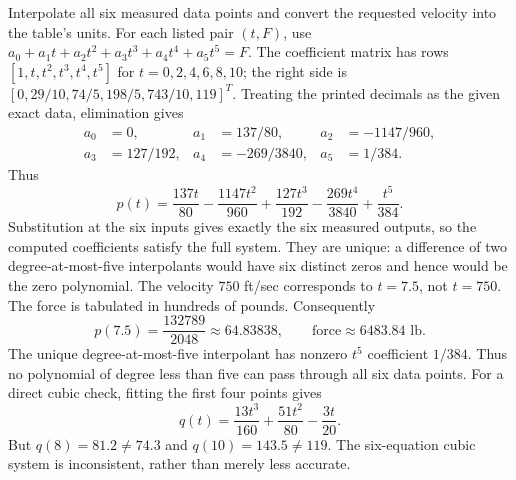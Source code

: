 \goal Interpolate all six measured data points and convert the requested
velocity into the table's units.
For each listed pair $(t,F)$, use
$a_0+a_1t+a_2t^2+a_3t^3+a_4t^4+a_5t^5=F$.
The coefficient matrix has rows $[1,t,t^2,t^3,t^4,t^5]$ for
$t=0,2,4,6,8,10$; the right side is
$[0,29/10,74/5,198/5,743/10,119]^T$.
Treating the printed decimals as the given exact data, elimination gives
\[
\begin{aligned}
a_0&=0,&a_1&=137/80,&a_2&=-1147/960,\\
a_3&=127/192,&a_4&=-269/3840,&a_5&=1/384.
\end{aligned}
\]
Thus
\[
p(t)=\frac{137t}{80}-\frac{1147t^2}{960}
 +\frac{127t^3}{192}-\frac{269t^4}{3840}+\frac{t^5}{384}.
\]
Substitution at the six inputs gives exactly the six measured outputs,
so the computed coefficients satisfy the full system. They are unique:
a difference of two degree-at-most-five interpolants would have six
distinct zeros and hence would be the zero polynomial.
The velocity $750$ ft/sec corresponds to $t=7.5$, not $t=750$.
The force is tabulated in hundreds of pounds. Consequently
\[
 p(7.5)=\frac{132789}{2048}\approx64.83838,
 \qquad \text{force}\approx6483.84\text{ lb}.
\]
The unique degree-at-most-five interpolant has nonzero $t^5$
coefficient $1/384$. Thus no polynomial of degree less than five can
pass through all six data points. For a direct cubic check, fitting the
first four points gives
\[
 q(t)=\frac{13t^3}{160}+\frac{51t^2}{80}-\frac{3t}{20}.
\]
But $q(8)=81.2\ne74.3$ and $q(10)=143.5\ne119$. The six-equation
cubic system is inconsistent, rather than merely less accurate.
